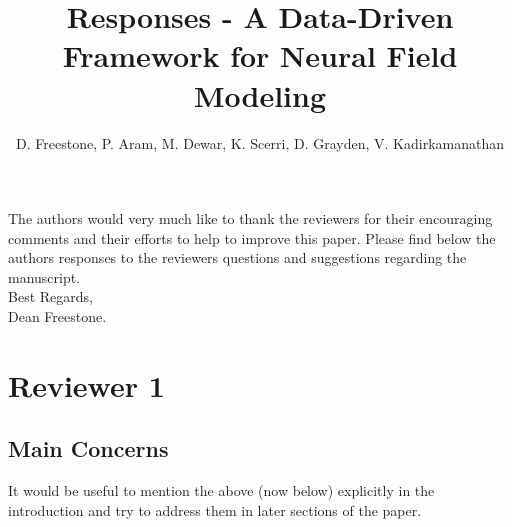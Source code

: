 \documentclass{article}
\title{Responses - A Data-Driven Framework for Neural Field Modeling}
\author{D. Freestone, P. Aram, M. Dewar, K. Scerri, D. Grayden, V. Kadirkamanathan}
\begin{document}
    \maketitle

    The authors would very much like to thank the reviewers for their encouraging comments and their efforts to help to improve this paper. Please find below the authors responses to the reviewers questions and suggestions regarding the manuscript. 
\\

Best Regards,
\\

Dean Freestone.

    \section{Reviewer 1}
    
    \subsection{Main Concerns}
    It would be useful to mention the above (now below) explicitly in the introduction and try to address them in later sections of the paper.
\end{document}
